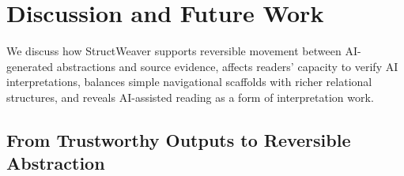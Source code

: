 \documentclass[manuscript,review,anonymous]{acmart}
\begin{document}



\section{Discussion and Future Work}
\label{sec:discussion}

We discuss how StructWeaver supports reversible movement between AI-generated abstractions and source evidence, affects readers' capacity to verify AI interpretations, balances simple navigational scaffolds with richer relational structures, and reveals AI-assisted reading as a form of interpretation work.

\subsection{From Trustworthy Outputs to Reversible Abstraction}
\end{document}
